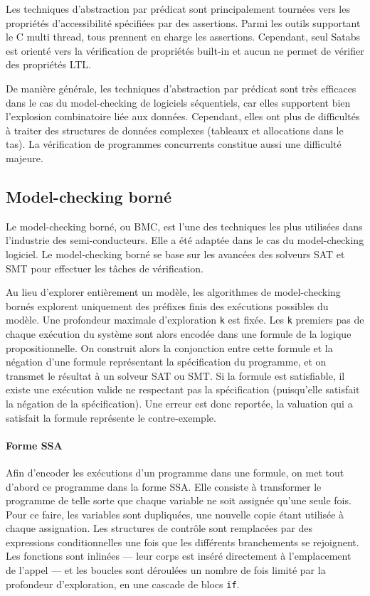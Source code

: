 Les techniques d'abstraction par prédicat sont principalement tournées vers les
propriétés d'accessibilité spécifiées par des assertions. Parmi les outils
supportant le C multi thread, tous prennent en charge les assertions. Cependant, seul
Satabs est orienté vers la vérification de propriétés built-in et aucun ne
permet de vérifier des propriétés \ac{LTL}.

De manière générale, les techniques d'abstraction par prédicat sont très
efficaces dans le cas du model-checking de logiciels séquentiels, car elles
supportent bien l'explosion combinatoire liée aux données. Cependant, elles ont
plus de difficultés à traiter des structures de données complexes (tableaux et
allocations dans le tas). La vérification de programmes concurrents constitue
aussi une difficulté majeure.

\subsection{Model-checking borné}

Le model-checking borné, ou \ac{BMC}, est l'une des
techniques les plus utilisées dans l'industrie des semi-conducteurs. Elle a été
adaptée dans le cas du model-checking logiciel. Le model-checking borné se base
sur les avancées des solveurs SAT et SMT pour effectuer les tâches de
vérification.

Au lieu d'explorer entièrement un modèle, les algorithmes de model-checking
bornés explorent uniquement des préfixes finis des exécutions possibles du
modèle. Une profondeur maximale d'exploration \texttt{k} est fixée.
Les \texttt{k} premiers pas de chaque exécution du système sont alors
encodée dans une formule de la logique propositionnelle.
On construit alors la conjonction entre cette formule et la négation d'une
formule représentant la spécification du programme, et on transmet le résultat
à un solveur SAT ou SMT. Si la formule est satisfiable, il existe une
exécution valide ne respectant pas la spécification (puisqu’elle satisfait la
négation de la spécification). Une erreur est donc reportée, la valuation qui a
satisfait la formule représente le contre-exemple.

\paragraph{Forme SSA}
Afin d'encoder les exécutions d'un programme dans une
formule, on met tout d'abord ce programme dans la forme \ac{SSA}.
Elle consiste à transformer le programme de telle sorte que chaque
variable ne soit assignée qu'une seule fois. Pour ce faire, les variables sont
dupliquées, une nouvelle copie étant utilisée à chaque assignation. Les
structures de contrôle sont remplacées par des expressions conditionnelles une
fois que les différents branchements se rejoignent. Les fonctions sont inlinées
--- leur corps est inséré directement à l'emplacement de l'appel --- et les
boucles sont déroulées un nombre de fois limité par la profondeur d'exploration,
en une cascade de blocs \texttt{if}.

